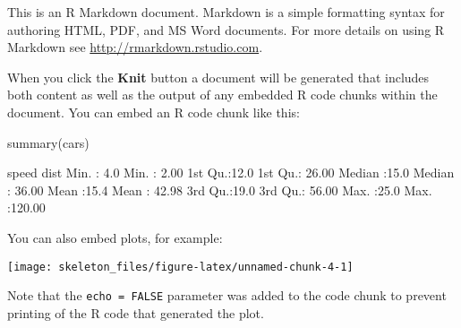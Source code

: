 \documentclass[12pt,twoside]{reedthesis}
\begin{document}
This is an R Markdown document. Markdown is a simple formatting syntax
for authoring HTML, PDF, and MS Word documents. For more details on
using R Markdown see \url{http://rmarkdown.rstudio.com}.

When you click the \textbf{Knit} button a document will be generated
that includes both content as well as the output of any embedded R code
chunks within the document. You can embed an R code chunk like this:

\begin{CodeChunk}
\begin{CodeInput}
summary(cars)
\end{CodeInput}
\begin{CodeOutput}
     speed           dist       
 Min.   : 4.0   Min.   :  2.00  
 1st Qu.:12.0   1st Qu.: 26.00  
 Median :15.0   Median : 36.00  
 Mean   :15.4   Mean   : 42.98  
 3rd Qu.:19.0   3rd Qu.: 56.00  
 Max.   :25.0   Max.   :120.00  
\end{CodeOutput}
\end{CodeChunk}

You can also embed plots, for example:

\begin{CodeChunk}


\begin{center}\texttt{[image: skeleton\_files/figure-latex/unnamed-chunk-4-1]} \end{center}

\end{CodeChunk}

Note that the \texttt{echo = FALSE} parameter was added to the code
chunk to prevent printing of the R code that generated the plot.
\end{document}
